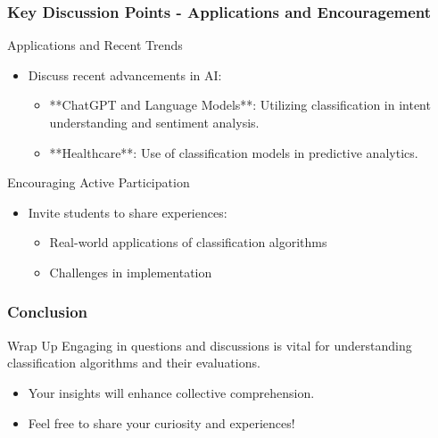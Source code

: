 \documentclass[aspectratio=169]{beamer}
\begin{document}
\begin{frame}[fragile]
    \frametitle{Key Discussion Points - Applications and Encouragement}
    \begin{block}{Applications and Recent Trends}
        \begin{itemize}
            \item Discuss recent advancements in AI:
            \begin{itemize}
                \item **ChatGPT and Language Models**: Utilizing classification in intent understanding and sentiment analysis.
                \item **Healthcare**: Use of classification models in predictive analytics.
            \end{itemize}
        \end{itemize}
    \end{block}
    \begin{block}{Encouraging Active Participation}
        \begin{itemize}
            \item Invite students to share experiences:
            \begin{itemize}
                \item Real-world applications of classification algorithms
                \item Challenges in implementation
            \end{itemize}
        \end{itemize}
    \end{block}
\end{frame}

\begin{frame}[fragile]
    \frametitle{Conclusion}
    \begin{block}{Wrap Up}
        Engaging in questions and discussions is vital for understanding classification algorithms and their evaluations.
        \begin{itemize}
            \item Your insights will enhance collective comprehension.
            \item Feel free to share your curiosity and experiences!
        \end{itemize}
    \end{block}
\end{frame}
\end{document}
